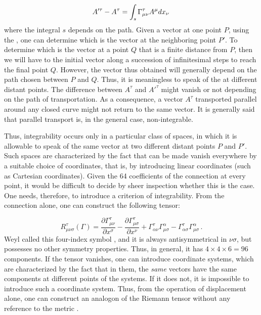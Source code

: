 \documentclass[submitted]{article}
\begin{document}
\begin{equation*}
A'^{\tau}-A^{\tau}=\int_{s} \Gamma^\tau_{\mu\nu} A^{\mu} d x_{\nu}\,
\end{equation*}
%
where the integral $s$ depends on the path. Given a vector at one point $P$, using the \Gtmn, one can determine which is the  vector at the neighboring point $P'$. To determine which is the  vector at a point $Q$ that is a finite distance from $P$, then we will have to  the initial vector along a succession of infinitesimal steps to reach the final point $Q$. However, the vector thus obtained will generally depend on the path chosen between $P$ and $Q$. Thus, it is meaningless to speak of the  at different distant points. The difference between $A^\tau$ and $A'^\tau$ might vanish or not depending on the path of transportation. As a consequence, a vector $A^\tau$ transported parallel around any closed curve might not return to the same vector. It is generally said that parallel transport is, in the general case, non-integrable. 

Thus, integrability occurs only in a particular class of spaces, in which it is allowable to speak of the same vector at two different distant points $P$ and $P'$. Such spaces are characterized by the fact that \Gtmn can be made vanish everywhere by a suitable choice of coordinates, that is, by introducing linear coordinates (such as Cartesian coordinates). Given the 64 coefficients of the connection \Gtmn at every point, it would be difficult to decide by sheer inspection whether this is the case. One needs, therefore, to introduce a criterion of integrability. From the connection alone, one can construct the following tensor:

\begin{equation}\label{eq:riemanntensorgamma}
R_{\mu \nu \sigma}^{\tau}(\Gamma)=\frac{\partial \Gamma_{\mu \nu}^{\tau}}{\partial x^{\sigma}}-\frac{\partial \Gamma_{\mu \sigma}^{\tau}}{\partial x^{\nu}}+\Gamma_{\alpha \nu}^{\tau} \Gamma_{\mu \sigma}^{\alpha}-\Gamma_{\alpha \sigma}^{\tau} \Gamma_{\mu\sigma}^{\alpha}\,.	
\end{equation}
%
Weyl called this four-index symbol , and it is always antisymmetrical in $\nu\sigma$, but possesses no other symmetry properties. Thus, in general, it has $4 \times 4 \times 6=96$ components. If the tensor \ritea vanishes, one can introduce  coordinate systems, which are characterized by the fact that in them, the \emph{same} vectors have the same components at different points of the systems. If it does not, it is impossible to introduce such a  coordinate system. Thus, from the operation of displacement alone, one can construct an analogon of the Riemann tensor \riteg without any reference to the metric \gmn.
\end{document}
